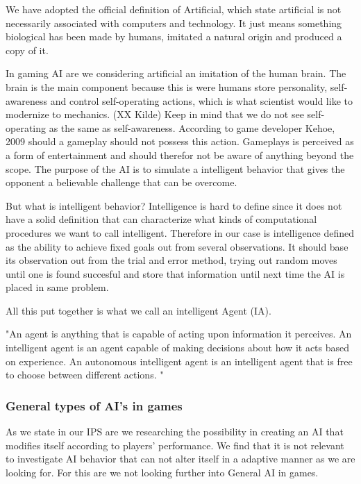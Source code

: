 We have adopted the official definition of Artificial, which state artificial is not necessarily associated with computers and technology. \cite {artificial2014} It just means something biological has been made by humans, imitated a natural origin and produced a copy of it.

In gaming AI are we considering artificial an imitation of the human brain. The brain is the main component because this is were humans store personality, self-awareness and control self-operating actions, which is what scientist would like to modernize to mechanics. (XX Kilde)
Keep in mind that we do not see self-operating as the same as self-awareness. According to game developer Kehoe, 2009 should a gameplay should not possess this action. \cite {Kehoe2009}Gameplays is perceived as a form of entertainment and should therefor not be aware of anything beyond the scope. The purpose of the AI is to simulate a intelligent behavior that gives the opponent a believable challenge that can be overcome.

But what is intelligent behavior? Intelligence is hard to define since it does not have a solid definition that can characterize what kinds of computational procedures we want to call intelligent.  \cite {McCarthy2007} Therefore in our case is intelligence defined as the ability to achieve fixed goals out from several observations.
It should base its observation out from the trial and error method, trying out random moves until one is found succesful and store that information until next time the AI is placed in same problem.

All this put together is what we call an intelligent Agent (IA).

"An agent is anything that is capable of acting upon information it perceives. An intelligent agent is an agent capable of making decisions about how it acts based on experience. An autonomous intelligent agent is an intelligent agent that is free to choose between different actions. "  \cite {Mills2005}



\subsubsection{General types of AI's in games}

As we state in our IPS are we researching the possibility in creating an AI that modifies itself according to players' performance. We find that it is not relevant to investigate AI behavior that can not alter itself in a adaptive manner as we are looking for. For this are we not looking further into General AI in games.


